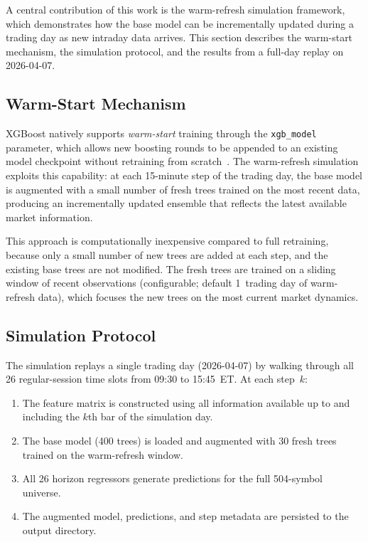\documentclass[conference]{IEEEtran}
\begin{document}
A central contribution of this work is the warm-refresh simulation framework, which demonstrates how the base model can be incrementally updated during a trading day as new intraday data arrives. This section describes the warm-start mechanism, the simulation protocol, and the results from a full-day replay on 2026-04-07.

\subsection{Warm-Start Mechanism}

XGBoost natively supports \emph{warm-start} training through the \texttt{xgb\_model} parameter, which allows new boosting rounds to be appended to an existing model checkpoint without retraining from scratch~\cite{chen2016xgboost}. The warm-refresh simulation exploits this capability: at each 15-minute step of the trading day, the base model is augmented with a small number of fresh trees trained on the most recent data, producing an incrementally updated ensemble that reflects the latest available market information.

This approach is computationally inexpensive compared to full retraining, because only a small number of new trees are added at each step, and the existing base trees are not modified. The fresh trees are trained on a sliding window of recent observations (configurable; default 1~trading day of warm-refresh data), which focuses the new trees on the most current market dynamics.

\subsection{Simulation Protocol}

The simulation replays a single trading day (2026-04-07) by walking through all 26 regular-session time slots from 09:30 to 15:45~ET. At each step~$k$:

\begin{enumerate}
    \item The feature matrix is constructed using all information available up to and including the $k$th bar of the simulation day.
    \item The base model (400 trees) is loaded and augmented with 30 fresh trees trained on the warm-refresh window.
    \item All 26 horizon regressors generate predictions for the full 504-symbol universe.
    \item The augmented model, predictions, and step metadata are persisted to the output directory.
\end{enumerate}
\end{document}
